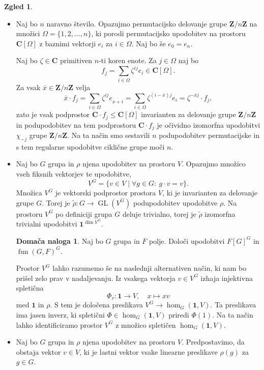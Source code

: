 \documentclass[11pt]{book}
\def\ZZ{\mathbf{Z}}
\def\CC{\mathbf{C}}
\def\11{\mathbf{1}}
\DeclareMathOperator\fun{fun}
\DeclareMathOperator\GL{GL}
\theoremstyle{definition}
\theoremstyle{zgled}
\newtheorem*{zgled}{Zgled}
\theoremstyle{odprtproblem}
\theoremstyle{domacanaloga}
\newtheorem*{domacanaloga}{Domača naloga}
\theoremstyle{izrek}
\begin{document}
\begin{zgled} \leavevmode
\begin{itemize}
    \item Naj bo $n$ naravno število. Opazujmo permutacijsko delovanje grupe $\ZZ/n\ZZ$ na množici $\Omega = \{ 1, 2, \dots, n \}$, ki porodi permutacijsko upodobitev na prostoru $\CC[\Omega]$ z baznimi vektorji $e_i$ za $i \in \Omega$. Naj bo še $e_0 = e_n$.
    
    Naj bo $\zeta \in \CC$ primitiven $n$-ti koren enote. Za $j \in \Omega$ naj bo
    \[
        f_j = \sum_{i \in \Omega} \zeta^{ij} e_i \in \CC[\Omega].
    \]
    Za vsak $\bar x \in \ZZ/n\ZZ$ velja
    \[
        \bar x \cdot f_j =
        \sum_{i \in \Omega} \zeta^{ij} e_{\overline{x + i}} =
        \sum_{i \in \Omega} \zeta^{(i - \bar x)j} e_{i} =
        \zeta^{-\bar x j} \cdot f_j,
    \]
    zato je vsak podprostor $\CC \cdot f_j \leq \CC[\Omega]$ invarianten za delovanje grupe $\ZZ/n\ZZ$ in podupodobitev na tem podprostoru $\CC \cdot f_j$ je očividno izomorfna upodobitvi $\chi_{-j}$ grupe $\ZZ/n\ZZ$. Na ta način smo sestavili $n$ podupodobitev permutacijske in s tem regularne upodobitve ciklične grupe moči $n$.

    \item Naj bo $G$ grupa in $\rho$ njena upodobitev na prostoru $V$. Opazujmo množico vseh fiksnih vektorjev te upodobitve,
    \[
        V^G = \{ v \in V \mid \forall g \in G \colon \ g \cdot v = v \}.
    \]
    Množica $V^G$ je vektorski podprostor prostora $V$, ki je invarianten za delovanje grupe $G$. Torej je $\tilde \rho \colon G \to \GL(V^G)$ podupodobitev upodobitve $\rho$. Na prostoru $V^G$ po definiciji grupa $G$ deluje trivialno, torej je $\tilde \rho$ izomorfna trivialni upodobitvi $\11^{\dim V^G}$.

    \begin{domacanaloga}
        Naj bo $G$ grupa in $F$ polje. Določi upodobitvi $F[G]^G$ in $\fun(G,F)^G$.
    \end{domacanaloga}

    Prostor $V^G$ lahko razumemo še na naslednji alternativen način, ki nam bo prišel zelo prav v nadaljevanju. Iz vsakega vektorja $v \in V^G$ izhaja injektivna spletična
    \[
        \Phi_v \colon \11 \to V, \quad
        x \mapsto x v
    \]
    med $\11$ in $\rho$. S tem je določena preslikava $V^G \to \hom_G(\11, V)$. Ta preslikava ima jasen inverz, ki spletični $\Phi \in \hom_G(\11, V)$ priredi $\Phi(1)$. Na ta način lahko identificiramo prostor $V^G$ z množico spletičen $\hom_G(\11, V)$.
    \item Naj bo $G$ grupa in $\rho$ njena upodobitev na prostoru $V$. Predpostavimo, da obstaja vektor $v \in V$, ki je lastni vektor vsake linearne preslikave $\rho(g)$ za $g \in G$. 
    

\end{itemize}
\end{zgled}
\end{document}
